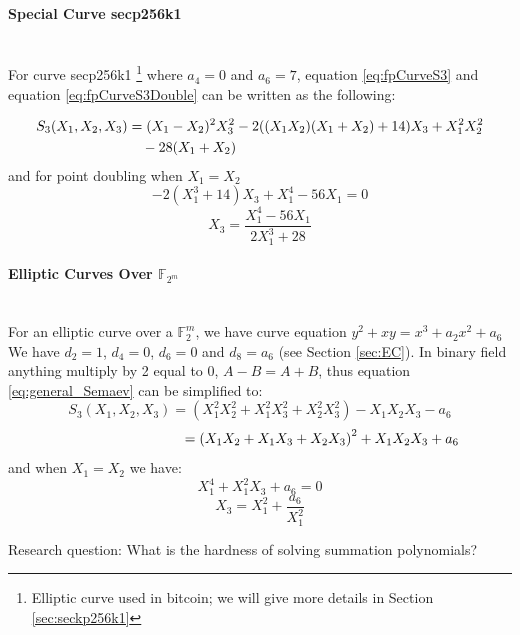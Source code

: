 \paragraph{Special Curve secp256k1} \mbox{ } \\
For curve secp256k1 \footnote{Elliptic curve used in bitcoin; we will give more details in Section \ref{sec:seckp256k1} } where $a_4 = 0$ and $a_6 = 7$, equation \ref{eq:fpCurveS3} and equation \ref{eq:fpCurveS3Double} can be written as the following:

\begin{equation} \label{eq:secp256CurveS3}
\begin{split}
S_3( X_1,X_2,X_3) &= ( X_1-X_2)^2X_3^2-2( ( X_1X_2)(X_1+X_2 ) + 14) X_3 + X_1^2X_2^2 \\
&\text{\space \space \space } - 28(X_1+X_2)
\end{split}
\end{equation}
and for point doubling when $X_1=X_2$
$$ -2\left( X_1^3 + 14\right)X_3+ X_1^4 - 56 X_1 = 0 $$
$$ X_3 = \frac{X_1^4-56X_1}{2X_1^3+28}$$

\paragraph{Elliptic Curves Over $\mathbb{F}_{2^m}$} \mbox{} \\
For an elliptic curve over a $\mathbb{F}_2^m$, we have curve equation $y^2+xy=x^3+a_2x^2+a_6$
We have $d_2=1$, $d_4=0$, $d_6=0$ and $d_8=a_6$ (see Section \ref{sec:EC}). In binary field anything multiply by 2 equal to 0, $A-B=A+B$, thus equation \ref{eq:general_Semaev} can be simplified to:
$$S_3(X_1,X_2,X_3) = (X_1^2X_2^2+X_1^2X_3^2+X_2^2X_3^2)-X_1X_2X_3-a_6$$
$$\text{\space\space\space\space\space\space\space\space\space\space\space\space\space\space\space\space\space\space\space\space\space\space\space\space\space\space} = \left( X_1X_2+X_1X_3+X_2X_3 \right) ^2 + X_1X_2X_3+a_6$$
and when $X_1=X_2$ we have:
$$X_1^4+X_1^2X_3+a_6=0$$
$$X_3=X_1^2+\frac{a_6}{X_1^2}$$

Research question: What is the hardness of solving summation polynomials?

